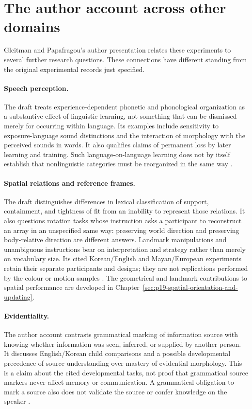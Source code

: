 \section{The author account across other domains}
\label{sec:p19-lc-domains}

Gleitman and Papafragou's author presentation relates these experiments
to several further research questions. These connections have different
standing from the original experimental records just specified.

\paragraph{Speech perception.}
The draft treats experience-dependent phonetic and phonological
organization as a substantive effect of linguistic learning, not something
that can be dismissed merely for occurring within language. Its examples
include sensitivity to exposure-language sound distinctions and the
interaction of morphology with the perceived sounds in words. It also
qualifies claims of permanent loss by later learning and training.
Such language-on-language learning does not by itself establish that
nonlinguistic categories must be reorganized in the same way
\cite[author-draft pp.~17--20]{GleitmanPapafragouLanguageThoughtAuthorDraftLC}.

\paragraph{Spatial relations and reference frames.}
The draft distinguishes differences in lexical classification of support,
containment, and tightness of fit from an inability to represent those
relations. It also questions rotation tasks whose instruction asks a
participant to reconstruct an array in an unspecified same way: preserving
world direction and preserving body-relative direction are different
answers. Landmark manipulations and unambiguous instructions bear on
interpretation and strategy rather than merely on vocabulary size.
Its cited Korean/English and Mayan/European experiments retain their
separate participants and designs; they are not replications performed by
the colour or motion samples
\cite[author-draft pp.~30--33,37--41]{GleitmanPapafragouLanguageThoughtAuthorDraftLC}.
The geometrical and landmark contributions to spatial performance are
developed in Chapter~\ref{sec:p19-spatial-orientation-and-updating}.

\paragraph{Evidentiality.}
The author account contrasts grammatical marking of information source
with knowing whether information was seen, inferred, or supplied by
another person. It discusses English/Korean child comparisons and a
possible developmental precedence of source understanding over mastery
of evidential morphology. This is a claim about the cited developmental
tasks, not proof that grammatical source markers never affect memory or
communication. A grammatical obligation to mark a source also does not
validate the source or confer knowledge on the speaker
\cite[author-draft pp.~41--42]{GleitmanPapafragouLanguageThoughtAuthorDraftLC}.

